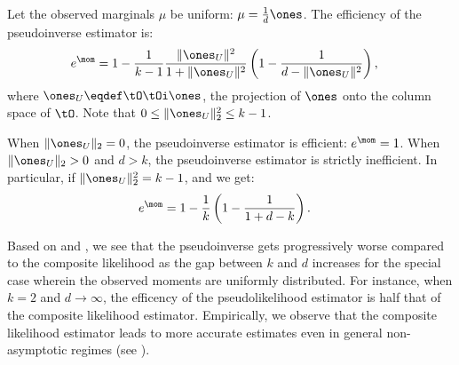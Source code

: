 \begin{lemma}
  Let the observed marginals $\mu$ be uniform: $\mu = \frac{1}{d} \ones$. 
  The efficiency of the pseudoinverse estimator is:
  \begin{align}
    e^\mom &= 
    1 - \frac{1}{k-1}\frac{\|\ones_U\|^2}{1 + \|\ones_U\|^2} \left( 1 - \frac{1}{d - \|\ones_U\|^2} \right) \label{eqn:efficiency},
  \end{align}
  where $\ones_U \eqdef \tO\tOi \ones$, the projection of $\ones$ onto
  the column space of $\tO$. Note that $0 \le \|\ones_U\|^2_2 \le k-1$.

  When $\|\ones_U\|_2 = 0$, the pseudoinverse estimator is efficient:
  $e^\mom = 1$. When $\|\ones_U\|_2 > 0$ and $d > k$, the pseudoinverse
  estimator is strictly inefficient. In particular, if $\|\ones_U\|^2_2
  = k-1$, and we get:
  \begin{align}
    e^\mom 
    &= 1 - \frac{1}{k} \left(1 - \frac{1}{1 + d - k} \right) \label{eqn:k-eff}.
  \end{align}
\end{lemma}

Based on  and , we see that the pseudoinverse gets
progressively worse compared to the composite likelihood as the gap
between $k$ and $d$ increases for the special case wherein the observed
moments are uniformly distributed.
For instance, when $k = 2$ and $d \to \infty$, the efficency of the pseudolikelihood
estimator is half that of the composite likelihood estimator.
Empirically, we observe that the composite likelihood estimator leads to more
accurate estimates even in general non-asymptotic regimes (see ).


